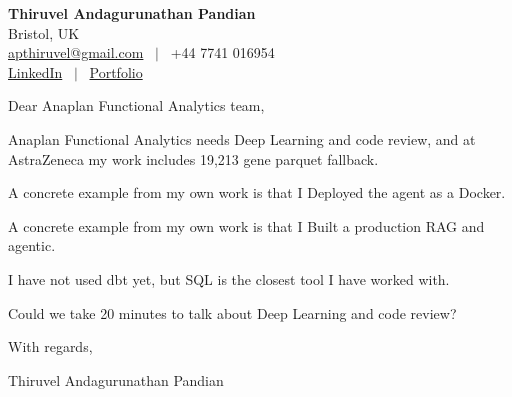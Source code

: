 \documentclass[11pt,a4paper]{article}
\begin{document}
\raggedright
\pagestyle{empty}

\begin{center}
    {\LARGE \color{linkblue} \textbf{Thiruvel Andagurunathan Pandian}}\\[0.2cm]
    Bristol, UK \\
    \href{mailto:apthiruvel@gmail.com}{apthiruvel@gmail.com} \ $|$ \ +44 7741 016954 \\
\href{https://www.linkedin.com/in/thiruvel-a-p/}{LinkedIn} \ $|$ \ \href{https://thiruvel-ap.github.io/PersonalPortfolio/}{Portfolio}
\end{center}

\vspace{0.4cm}

\noindent
Dear Anaplan Functional Analytics team,

Anaplan Functional Analytics needs Deep Learning and code review, and at AstraZeneca my work includes 19,213 gene parquet fallback.

A concrete example from my own work is that I Deployed the agent as a Docker.

A concrete example from my own work is that I Built a production RAG and agentic.

I have not used dbt yet, but SQL is the closest tool I have worked with.

Could we take 20 minutes to talk about Deep Learning and code review?

\vspace{0.5cm}

With regards,

Thiruvel Andagurunathan Pandian
\end{document}
